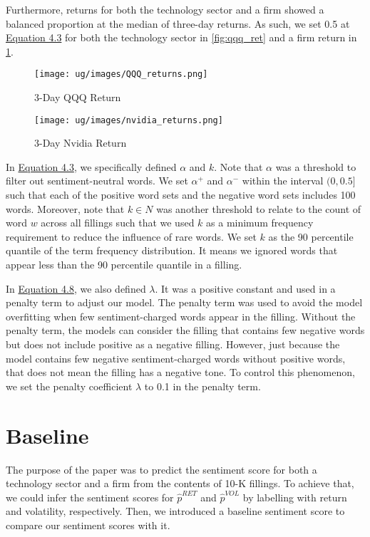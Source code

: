 \documentclass[logo,bsc,singlespacing,parskip]{infthesis}
\begin{document}
Furthermore, returns for both the technology sector and a firm showed a balanced proportion at the median of three-day returns. As such, we set 0.5 at \hyperref[4.3]{Equation 4.3} for both the technology sector in \ref{fig:qqq_ret} and a firm return in \ref{fig:nvidia_ret}. 

\begin{figure}[ht]
  \centering
  \begin{minipage}{0.5\textwidth}
    \centering
    \texttt{[image: ug/images/QQQ\_returns.png]} %
    \caption{3-Day QQQ Return}
    \label{fig:qqq_ret}
  \end{minipage}%
  \begin{minipage}{0.5\textwidth}
    \centering
    \texttt{[image: ug/images/nvidia\_returns.png]} %
    \caption{3-Day Nvidia Return}
    \label{fig:nvidia_ret}
  \end{minipage}
\end{figure}

In \hyperref[4.3]{Equation 4.3}, we specifically defined $\alpha$  and $k$. Note that $\alpha$ was a threshold to filter out sentiment-neutral words. We set $\alpha^{+}$ and $\alpha^{-}$ within the interval $(0,0.5]$ such that each of the positive word sets and the negative word sets includes 100 words. Moreover, note that $k \in N$ was another threshold to relate to the count of word $w$ across all fillings such that we used $k$ as a minimum frequency requirement to reduce the influence of rare words. We set $k$ as the 90 percentile quantile of the term frequency distribution. It means we ignored words that appear less than the 90 percentile quantile in a filling. 

In \hyperref[4.8]{Equation 4.8}, we also defined $\lambda$. It was a positive constant and used in a penalty term to adjust our model. The penalty term was used to avoid the model overfitting when few sentiment-charged words appear in the filling. Without the penalty term, the models can consider the filling that contains few negative words but does not include positive as a negative filling. However, 
just because the model contains few negative sentiment-charged words without positive words, that does not mean the filling has a negative tone. To control this phenomenon, we set the penalty coefficient $\lambda$ to 0.1 in the penalty term.

\section{Baseline}
The purpose of the paper was to predict the sentiment score for both a technology sector and a firm from the contents of 10-K fillings. To achieve that, we could infer the sentiment scores for $\hat{p}^{RET}$ and $\hat{p}^{VOL}$ by labelling with return and volatility, respectively. Then, we introduced a baseline sentiment score to compare our sentiment scores with it. 
\end{document}
